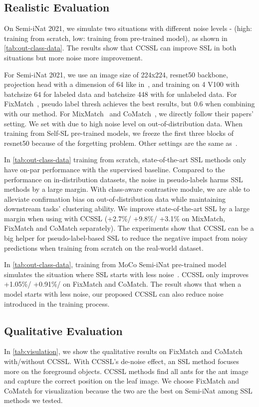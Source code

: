 \documentclass[10pt,twocolumn,letterpaper]{article}
\begin{document}
\subsection{Realistic Evaluation} \label{exp:real}
On Semi-iNat 2021, we simulate two situations with different noise levels - (high: training from scratch, low: training from pre-trained model), as shown in \cref{tab:out-class-data}. The results show that CCSSL can improve SSL in both situations but more noise more improvement. 

For Semi-iNat 2021, we use an image size of 224x224, resnet50 backbone, projection head with a dimension of 64 like in~\cite{he2020momentum}, and training on 4 V100 with batchsize 64 for labeled data and batchsize 448 with  for unlabeled data. For FixMatch~\cite{sohn2020fixmatch}, pseudo label thresh  achieves the best results, but 0.6 when combining with our method. For MixMatch~\cite{berthelot2019mixmatch} and CoMatch~\cite{li2021comatch}, we directly follow their papers' setting. We set   with  due to high noise level on out-of-distribution data. When training from Self-SL pre-trained models, we freeze the first three blocks of resnet50 because of the forgetting problem. Other settings are the same as~\cite{su2021realistic}. 


In \cref{tab:out-class-data} training from scratch, state-of-the-art SSL methods only have on-par performance with the supervised baseline. Compared to the performance on in-distribution datasets, the noise in pseudo-labels harms SSL methods by a large margin. With class-aware contrastive module, we are able to alleviate confirmation bias on out-of-distribution data while maintaining downstream tasks' clustering ability. We improve state-of-the-art SSL by a large margin when using with CCSSL (+2.7\%/ +9.8\%/ +3.1\% on MixMatch, FixMatch and CoMatch separately). The experiments show that CCSSL can be a big helper for pseudo-label-based SSL to reduce the negative impact from noisy predictions when training from scratch on the real-world dataset.


In \cref{tab:out-class-data}, training from MoCo Semi-iNat pre-trained model simulates the situation where SSL starts with less noise~\cite{caron2021emerging}. CCSSL only improves +1.05\%/ +0.91\%/ on FixMatch and CoMatch. The result shows that when a model starts with less noise, our proposed CCSSL can also reduce noise introduced in the training process. 

\subsection{Qualitative Evaluation}
In \cref{tab:visulation}, we show the qualitative results on FixMatch and CoMatch with/without CCSSL. With CCSSL's de-noise effect, an SSL method focuses more on the foreground objects. CCSSL methods find all ants for the ant image and capture the correct position on the leaf image.  We choose FixMatch and CoMatch for visualization because the two are the best on Semi-iNat among SSL methods we tested.
\end{document}
